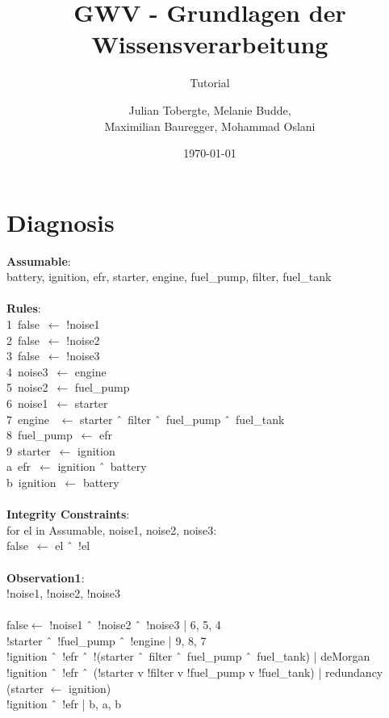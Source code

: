 \documentclass[DIV=12,numbers=noenddot]{scrartcl}
\title{GWV - Grundlagen der Wissensverarbeitung}
\subtitle{Tutorial \arabic{blatt}}
\author{Julian Tobergte, Melanie Budde,\\Maximilian Bauregger, Mohammad Oslani}
\date{\today}
\begin{document}
	\maketitle
	
			
	\section{Diagnosis}	
	\textbf{Assumable}:\\
	battery, ignition, efr, starter, engine, fuel\_pump, filter, fuel\_tank\\\\
	\textbf{Rules}:\\
	1\ false\ $\leftarrow$ !noise1\\
	2\ false\ $\leftarrow$ !noise2\\
	3\ false\ $\leftarrow$ !noise3\\
	4\ noise3\ $\leftarrow$ engine\\
	5\ noise2\ $\leftarrow$ fuel\_pump\\
	6\ noise1\ $\leftarrow$ starter\\
	7\ engine \ $\leftarrow$ starter \^\ \ filter \^\ \ fuel\_pump \^\ \  fuel\_tank\\
	8\ fuel\_pump\ $\leftarrow$ efr\\
	9\ starter\ $\leftarrow$ ignition\\
	a\ efr\ $\leftarrow$ ignition \^\ \ battery\\
	b\ ignition\ $\leftarrow$ battery\\\\
    \textbf{Integrity Constraints}:\\
	for el in Assumable, noise1, noise2, noise3:\\
	false\ $\leftarrow$ el \^\ \  !el\\\\
	\textbf{Observation1}:\\
	!noise1, !noise2, !noise3\\\\
	false$\leftarrow$ !noise1 \^\ \  !noise2 \^\ \ !noise3	| 6, 5, 4\\
	!starter \^\ \ !fuel\_pump \^\ \  !engine	| 9, 8, 7\\
	!ignition \^\ \  !efr \^\ \  !(starter \^\ \ filter \^\ \  fuel\_pump \^\ \ fuel\_tank) | deMorgan\\
	!ignition \^\ \ !efr \^\ \  (!starter v !filter v !fuel\_pump v !fuel\_tank) | redundancy (starter $\leftarrow$ ignition)\\
	!ignition \^\ \ !efr 	| b, a, b\\
\end{document}
